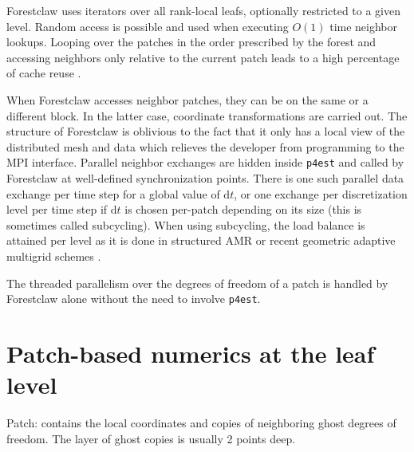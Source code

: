 \documentclass{IOS-Book-Article}     %
\newcommand{\comment}[1]{\textcolor{green}{[DAC: #1]}\xspace}
\newcommand{\todo}[1]{\textcolor{red}{[TODO: #1]}\xspace}
\newcommand{\dt}{\mathrm{d}t}
\newcommand{\forestclaw}{Forestclaw\xspace}
\newcommand{\pforest}{\texttt{p4est}\xspace}
\begin{document}
\forestclaw uses iterators over all rank-local leafs, optionally restricted to
a given level.  Random access is possible and used when executing $O(1)$ time
neighbor lookups.  Looping over the patches in the order prescribed by the
forest
and
accessing neighbors only relative to the current patch leads to a high
percentage of cache reuse
\cite{BursteddeBurtscherGhattasEtAl09}.

When \forestclaw accesses neighbor patches, they can be on the same or a
different block.  In the latter case, coordinate transformations are carried
out.  The structure of \forestclaw is oblivious to the fact that it only has a
local view of the distributed mesh and data which relieves the developer from
programming to the MPI interface.  Parallel neighbor exchanges are hidden
inside \pforest and called by \forestclaw at well-defined synchronization
points.  There is one such parallel data exchange per time step for a global
value of $\dt$, or one exchange per discretization level per time step if $\dt$
is chosen per-patch depending on its size (this is sometimes called
subcycling).  When using subcycling, the load balance is attained per level as
it is done in structured AMR or recent geometric adaptive multigrid schemes
\cite{SundarBirosBursteddeEtAl12}.

The threaded parallelism over the degrees of freedom of a patch is handled by
\forestclaw alone without the need to involve \pforest.






\section{Patch-based numerics at the leaf level}


Patch: contains the local coordinates and copies of neighboring ghost degrees
of freedom.  The layer of ghost copies is usually 2 points deep.
\end{document}
